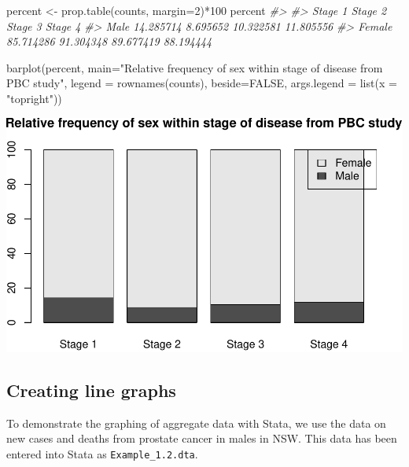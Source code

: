 \documentclass[
]{memoir}
\newenvironment{Shaded}{\begin{snugshade}}{\end{snugshade}}
\newcommand{\AttributeTok}[1]{\textcolor[rgb]{0.77,0.63,0.00}{#1}}
\newcommand{\CommentTok}[1]{\textcolor[rgb]{0.56,0.35,0.01}{\textit{#1}}}
\newcommand{\ConstantTok}[1]{\textcolor[rgb]{0.00,0.00,0.00}{#1}}
\newcommand{\DecValTok}[1]{\textcolor[rgb]{0.00,0.00,0.81}{#1}}
\newcommand{\FunctionTok}[1]{\textcolor[rgb]{0.00,0.00,0.00}{#1}}
\newcommand{\NormalTok}[1]{#1}
\newcommand{\OtherTok}[1]{\textcolor[rgb]{0.56,0.35,0.01}{#1}}
\newcommand{\SpecialCharTok}[1]{\textcolor[rgb]{0.00,0.00,0.00}{#1}}
\newcommand{\StringTok}[1]{\textcolor[rgb]{0.31,0.60,0.02}{#1}}
\begin{document}
\begin{Shaded}
\begin{Highlighting}[]
\NormalTok{percent }\OtherTok{\textless{}{-}} \FunctionTok{prop.table}\NormalTok{(counts, }\AttributeTok{margin=}\DecValTok{2}\NormalTok{)}\SpecialCharTok{*}\DecValTok{100}
\NormalTok{percent}
\CommentTok{\#\textgreater{}         }
\CommentTok{\#\textgreater{}            Stage 1   Stage 2   Stage 3   Stage 4}
\CommentTok{\#\textgreater{}   Male   14.285714  8.695652 10.322581 11.805556}
\CommentTok{\#\textgreater{}   Female 85.714286 91.304348 89.677419 88.194444}

\FunctionTok{barplot}\NormalTok{(percent, }\AttributeTok{main=}\StringTok{"Relative frequency of sex within stage of disease from PBC study"}\NormalTok{,}
        \AttributeTok{legend =} \FunctionTok{rownames}\NormalTok{(counts), }\AttributeTok{beside=}\ConstantTok{FALSE}\NormalTok{, }\AttributeTok{args.legend =} \FunctionTok{list}\NormalTok{(}\AttributeTok{x =} \StringTok{"topright"}\NormalTok{))}
\end{Highlighting}
\end{Shaded}

\includegraphics{01-IntroToR_files/figure-latex/unnamed-chunk-37-1.pdf}

\hypertarget{creating-line-graphs}{%
\subsection{Creating line graphs}\label{creating-line-graphs}}

To demonstrate the graphing of aggregate data with Stata, we use the data on new cases and deaths from prostate cancer in males in NSW. This data has been entered into Stata as \texttt{Example\_1.2.dta}.
\end{document}
